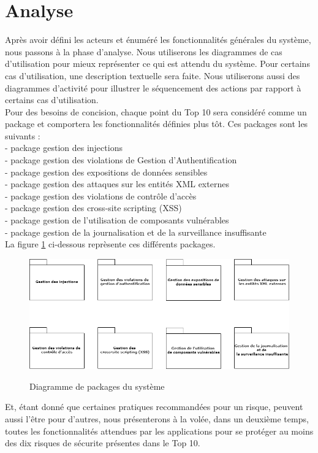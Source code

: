 \section{Analyse}
Après avoir défini les acteurs et énuméré les fonctionnalités générales du système, nous passons à la phase d'analyse. Nous utiliserons les diagrammes de cas d'utilisation pour mieux représenter ce qui est attendu du système. Pour certains cas d'utilisation, une description textuelle sera faite. Nous utiliserons aussi des diagrammes d'activité pour illustrer le séquencement des actions par rapport à certains cas d'utilisation.\\
Pour des besoins de concision, chaque point du Top 10 sera considéré comme un package et comportera les fonctionnalités définies plus tôt. Ces packages sont les suivants : \\
- package gestion des injections\\
- package gestion des violations de Gestion d’Authentification\\
- package gestion des expositions de données sensibles\\
- package gestion des attaques sur les entités XML externes\\
- package gestion des violations de contrôle d’accès\\
- package gestion des cross-site scripting (XSS)\\
- package gestion de l'utilisation de composants vulnérables\\
- package gestion de la journalisation et de la surveillance insuffisante\\
La figure \ref{fig:8.1} ci-dessous reprèsente ces différents packages.
\begin{figure}[h!]
	\centering
	\begin{minipage}{18cm}
		\centering
		{\includegraphics[height=0.27\textheight]{fig/Package-Diagram.png}}
	\end{minipage}
	\caption{Diagramme de packages du système}
	\label{fig:8.1}
\end{figure}
Et, étant donné que certaines pratiques recommandées pour un risque, peuvent aussi l'être pour d'autres, nous présenterons à la volée, dans un deuxième temps, toutes les fonctionnalités attendues par les applications pour se protéger au moins des dix risques de sécurite présentes dans le Top 10.\\

